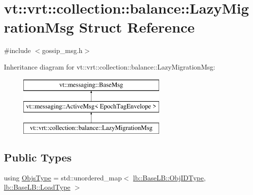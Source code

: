 \hypertarget{structvt_1_1vrt_1_1collection_1_1balance_1_1_lazy_migration_msg}{}\section{vt\+:\+:vrt\+:\+:collection\+:\+:balance\+:\+:Lazy\+Migration\+Msg Struct Reference}
\label{structvt_1_1vrt_1_1collection_1_1balance_1_1_lazy_migration_msg}


{\ttfamily \#include $<$gossip\+\_\+msg.\+h$>$}

Inheritance diagram for vt\+:\+:vrt\+:\+:collection\+:\+:balance\+:\+:Lazy\+Migration\+Msg\+:\begin{figure}[H]
\begin{center}
\leavevmode
\includegraphics[height=3.000000cm]{structvt_1_1vrt_1_1collection_1_1balance_1_1_lazy_migration_msg}
\end{center}
\end{figure}
\subsection*{Public Types}
\begin{DoxyCompactItemize}
\item 
using \hyperlink{structvt_1_1vrt_1_1collection_1_1balance_1_1_lazy_migration_msg_a8d71e0015ee1e05da54701cae56ef31c}{Objs\+Type} = std\+::unordered\+\_\+map$<$ \hyperlink{structvt_1_1vrt_1_1collection_1_1lb_1_1_base_l_b_a15a2f756b59c8c2437985206b32aa403}{lb\+::\+Base\+L\+B\+::\+Obj\+I\+D\+Type}, \hyperlink{structvt_1_1vrt_1_1collection_1_1lb_1_1_base_l_b_a215e22b9f12678303f49615ae3be05cc}{lb\+::\+Base\+L\+B\+::\+Load\+Type} $>$
\end{DoxyCompactItemize}
